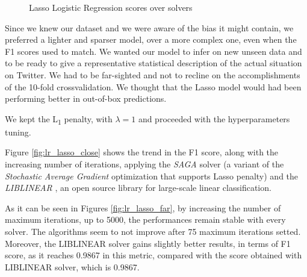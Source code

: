 \begin{figure}[htp!]
	\centering 
	\caption{Lasso Logistic Regression scores over solvers}
\end{figure}


Since we knew our dataset and we were aware of the bias it might contain, we preferred a lighter and sparser model, over a more complex one, even when the F1 scores used to match. We wanted our model to infer on new unseen data and to be ready to give a representative statistical description of the actual situation on Twitter.
We had to be far-sighted and not to recline on the accomplishments of the 10-fold crossvalidation. We thought that the Lasso model would had been performing better in out-of-box predictions.

We kept the L\textsubscript{1} penalty, with $ \lambda  = 1 $   and proceeded with the hyperparameters tuning.

Figure \ref{fig:lr_lasso_close} shows the trend in the F1 score, along with the increasing number of iterations, applying the \textit{SAGA} \cite{SAGA} solver (a variant of the \textit{Stochastic Average Gradient} \cite{SAG} optimization that supports Lasso penalty) and the \textit{LIBLINEAR} \cite{Liblinear}, an open source library for large-scale linear classification.

As it can be seen in Figures \ref{fig:lr_lasso_far}, by increasing the number of maximum iterations, up to 5000, the performances remain stable with every solver.
The algorithms seem to not improve after 75 maximum iterations setted.
Moreover, the LIBLINEAR solver gains slightly better results, in terms of F1 score, as it reaches 0.9867 in this metric, compared with the score obtained with LIBLINEAR solver, which is 0.9867.


